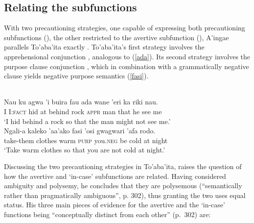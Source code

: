 \documentclass[output=paper,colorlinks,citecolor=brown]{langscibook}
\begin{document}
\subsection{Relating the subfunctions} \label{sec:relating}

With two precautioning strategies, one capable of expressing both precautioning subfunctions (\sane), the other restricted to the avertive subfunction (), A'ingae parallels To'aba'ita exactly \citep{lichtenberk1995apprehensional}. To'aba'ita's first strategy involves the apprehensional conjunction , analogous to  (\ref{ada}). Its second strategy involves the purpose clause conjunction , which in combination with a grammatically negative clause yields negative purpose semantics (\ref{fasi}).

\newpage
\begin{exe}
    \ex \label{ada}
     \\
    \gll Nau ku agwa 'i buira  fau  ada {\ob}wane 'eri ka riki nau.{\cb} \\
         I  I:\textsc{fact}      hid  at behind rock \textsc{appr} man that he see me \\
    \glt `I hid behind a rock so that the man might not see me.'
    \ex \label{fasi}
     \\
    \gll Ngali-a kaleko 'aa'ako {\ob}fasi 'osi gwagwari 'afa rodo.{\cb} \\
         take-them   clothes warm \textsc{purp} you.\textsc{neg} {be cold} at night \\
    \glt `Take warm clothes so that you are not cold at night.'
\end{exe}
    
Discussing the two precautioning strategies in To'aba'ita, \citet{lichtenberk1995apprehensional} raises the question of how the avertive and `in-case' subfunctions are related. Having considered ambiguity and polysemy, he concludes that they are polysemous (``semantically rather than pragmatically ambiguous'', p. 302), thus granting the two uses equal status. His three main pieces of evidence for the avertive and the `in-case' functions being ``conceptually distinct from each other'' (p.~302) are: %
\end{document}
